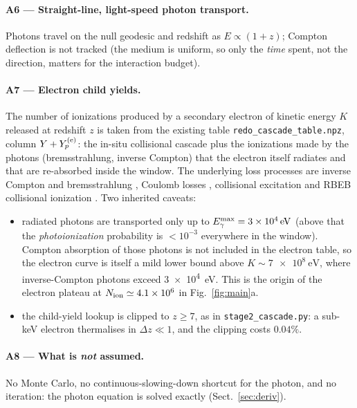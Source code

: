 \documentclass[11pt,a4paper]{article}
\begin{document}
\paragraph{A6 --- Straight-line, light-speed photon transport.}
Photons travel on the null geodesic and redshift as $E \propto (1+z)$;
Compton deflection is not tracked (the medium is uniform, so only the
\emph{time} spent, not the direction, matters for the interaction budget).

\paragraph{A7 --- Electron child yields.}
The number of ionizations produced by a secondary electron of kinetic energy
$K$ released at redshift $z$ is taken from the existing table
\texttt{redo\_\allowbreak cascade\_\allowbreak table.npz},
column $Y+Y_{p}^{\rm (e)}$: the
in-situ collisional cascade plus the ionizations made by the photons
(bremsstrahlung, inverse Compton) that the electron itself radiates and that
are re-absorbed inside the window. The underlying loss processes are inverse
Compton and bremsstrahlung \citep{blumenthal70}, Coulomb losses
\citep{gould72}, collisional excitation \citep{stone02} and RBEB collisional
ionization \citep{kim00}. Two inherited caveats:
\begin{itemize}\itemsep2pt
  \item radiated photons are transported only up to
  $E_\gamma^{\rm max}=\SI{3e4}{\electronvolt}$ (above that the
  \emph{photoionization} probability is $<10^{-3}$ everywhere in the window).
  Compton absorption of those photons is not included in the electron table,
  so the electron curve is itself a mild lower bound above
  $K\sim\SI{7e8}{\electronvolt}$, where inverse-Compton photons exceed
  \SI{3e4}{\electronvolt}. This is the origin of the electron plateau at
  $N_{\rm ion}\simeq4.1\times10^{6}$ in Fig.~\ref{fig:main}a.
  \item the child-yield lookup is clipped to $z\ge7$, as in
  \texttt{stage2\_cascade.py}: a sub-keV electron thermalises in
  $\Delta z \ll 1$, and the clipping costs $0.04\%$.
\end{itemize}

\paragraph{A8 --- What is \emph{not} assumed.}
No Monte Carlo, no continuous-slowing-down shortcut for the photon, and no
iteration: the photon equation is solved exactly (Sect.~\ref{sec:deriv}).
\end{document}
